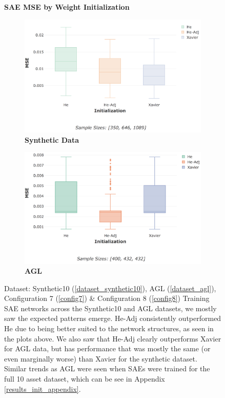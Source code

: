\documentclass[a4paper,11pt,oneside]{article}
\theoremstyle{plain}
\theoremstyle{definition}
\begin{document}
	\begin{figure}[H]
		\centering
		\textbf{SAE MSE by Weight Initialization}
		\begin{subfigure}{.5\textwidth}
			\centering 
			\includegraphics[scale=0.29]{images/results/8_4_weight_init/synthetic_mse_init.png}
			\caption{\textbf{Synthetic Data} 
				\newline }
			\label{figure-synthetic_mse_init}
		\end{subfigure}%
		\begin{subfigure}{.5\textwidth}
			\centering 
			\includegraphics[scale=0.28]{images/results/8_4_weight_init/agl_mse_init.png}
			\caption{\textbf{AGL} 
				\newline }
			\label{figure-agl_mse_init}
		\end{subfigure}
		\caption[SAE MSE by Weight Initialization]
		{Dataset: Synthetic10 (\ref{dataset_synthetic10}), AGL (\ref{dataset_agl}), Configuration 7 (\ref{config7}) \& Configuration 8 (\ref{config8})
			\newline Training SAE networks across the Synthetic10 and AGL  datasets, we mostly saw the expected patterns emerge. He-Adj consistently outperformed He due to being better suited to the network structures, as seen in the plots above. We also saw that He-Adj clearly outperforms Xavier for AGL data, but has performance that was mostly the same (or even marginally worse) than Xavier for the synthetic dataset. Similar trends as AGL were seen when SAEs were trained for the full 10 asset dataset, which can be see in Appendix \ref{results_init_appendix}.}
		\label{figure-mse_init}
	\end{figure}
	
\end{document}
